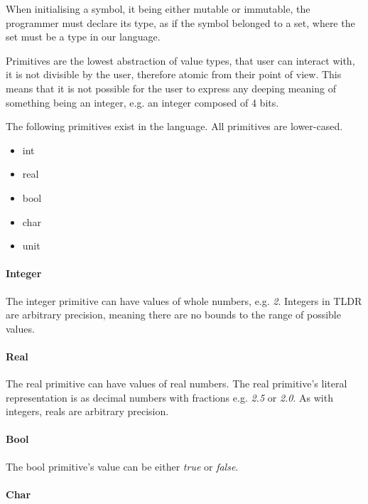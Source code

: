 When initialising a symbol, it being either mutable or immutable, the programmer must declare its type, as if the symbol belonged to a set, where the set must be a type in our language.

Primitives are the lowest abstraction of value types, that user can interact with, it is not divisible by the user, therefore atomic from their point of view. This means that it is not possible for the user to express any deeping meaning of something being an integer, e.g. an integer composed of 4 bits. %

The following primitives exist in the language. All primitives are lower-cased.

\begin{itemize}
  \item int
  \item real
  \item bool
  \item char
  \item unit
\end{itemize}

\paragraph{Integer}
\label{subsubsec:int}

The integer primitive can have values of whole numbers, e.g. \emph{2}. Integers in TLDR are arbitrary precision, meaning there are no bounds to the range of possible values.

\paragraph{Real}
\label{subsubsec:real}

The real primitive can have values of real numbers. The real primitive's literal representation is as decimal numbers with fractions e.g. \emph{2.5} or \emph{2.0}. As with integers, reals are arbitrary precision.

\paragraph{Bool}
\label{subsubsec:bool}

The bool primitive's value can be either \emph{true} or \emph{false}.

\paragraph{Char}
\label{sec:char}

